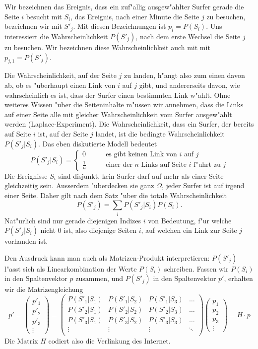 Wir bezeichnen das Ereignis, dass ein zuf"allig ausgew"ahlter Surfer gerade
die Seite $i$ besucht mit $S_i$, das Ereignis, nach einer Minute die Seite
$j$ zu besuchen, bezeichnen wir mit $S'_j$. Mit diesen Bezeichnungen ist
$p_i=P(S_i)$. Uns interessiert die Wahrscheinlichkeit $P(S'_j)$, nach dem erste
Wechsel die Seite $j$ zu besuchen.  Wir bezeichnen diese Wahrscheinlichkeit
auch mit mit $p_{j,1} = P(S'_j)$.

Die Wahrscheinlichkeit, auf der Seite $j$ zu landen,
h"angt also zum einen davon ab, ob es "uberhaupt
einen Link von $i$ auf $j$ gibt, und andererseits davon, wie wahrscheinlich
es ist, dass der Surfer einen bestimmten Link w"ahlt.
Ohne weiteres Wissen "uber die Seiteninhalte m"ussen wir
annehmen, dass die Links auf einer Seite alle mit gleicher Wahrscheinlichkeit
vom Surfer ausgew"ahlt werden (Laplace-Experiment).
Die Wahrscheinlichkeit, dass ein Surfer, der bereits
auf Seite $i$ ist, auf der Seite $j$ landet, ist die bedingte Wahrscheinlichkeit
$P(S'_j|S_i)$. Das eben diskutierte Modell bedeutet
\[
P(S'_j|S_i)=\begin{cases}
0&\qquad\text{es gibt keinen Link von $i$ auf $j$}\\
\frac1n&\qquad\text{einer der $n$ Links auf Seite $i$ f"uhrt zu $j$}
\end{cases}
\]
Die Ereignisse $S_i$ sind disjunkt, kein Surfer darf auf mehr als einer
Seite gleichzeitig sein.
Ausserdem "uberdecken sie ganz $\Omega$, jeder Surfer ist auf irgend einer
Seite.
Daher gilt nach dem Satz "uber die totale Wahrscheinlichkeit
\[
P(S'_j)=\sum_{i}P(S'_j|S_i)P(S_i).
\]
Nat"urlich sind nur gerade diejenigen Indizes $i$ von Bedeutung, f"ur welche $P(S'_j|S_i)$
nicht $0$ ist, also diejenige Seiten $i$, auf welchen ein Link zur Seite $j$
vorhanden ist.

Den Ausdruck kann man auch als Matrizen-Produkt interpretieren: $P(S'_j)$ l"asst sich
als Linearkombination der Werte $P(S_i)$ schreiben. Fassen wir $P(S_i)$ in den Spaltenvektor
$p$ zusammen, und $P(S'_j)$ in den Spaltenvektor $p'$, erhalten wir die Matrizengleichung
\[
p'=
\left(\begin{matrix}p'_1\\p'_2\\p'_3\\\vdots\end{matrix}\right)
=
\left(\begin{matrix}
P(S'_1|S_1)&P(S'_1|S_2)&P(S'_1|S_3)&\dots\\
P(S'_2|S_1)&P(S'_2|S_2)&P(S'_2|S_3)&\dots\\
P(S'_3|S_1)&P(S'_3|S_2)&P(S'_3|S_3)&\dots\\
\vdots&\vdots&\vdots&\ddots\\
\end{matrix}\right)
\left(\begin{matrix}p_1\\p_2\\p_3\\\vdots\end{matrix}\right)
=
H\cdot p
\]
Die Matrix $H$ codiert also die Verlinkung des Internet.

